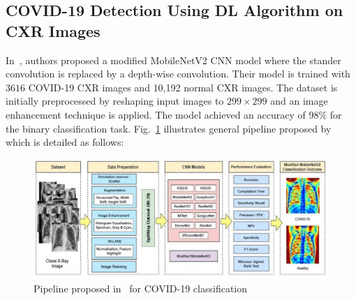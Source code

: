   
\subsection{COVID-19 Detection Using DL Algorithm on CXR Images}

In~\cite{akt}, authors proposed a modified MobileNetV2 CNN model where the stander convolution is replaced by a depth-wise convolution. Their model is trained with $3616$ COVID-19 CXR images and 10,192 normal CXR images. The dataset is initially preprocessed by reshaping input images to $299\times299$ and an image enhancement technique is applied. The model achieved an accuracy of 98\% for the binary classification task. Fig.~\ref{fig:akterPipeline} illustrates general pipeline proposed by~\cite{akt} which is detailed as follows:

\begin{figure}
    \begin{center}
        \includegraphics[width=\textwidth]{Figures/AkterPipeline.png}
        \caption{\label{fig:akterPipeline} Pipeline proposed in~\cite{akt} for COVID-19 classification}
    \end{center}
\end{figure}

